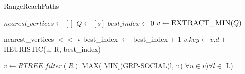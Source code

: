{%




\begin{algorithm}[t]
\caption{RangeReachPaths}
\begin{scriptsize}
\label{alg3}
\begin{algorithmic}[1]
	\State $nearest\_vertices \gets []$
	\State $Q \gets [s]$
	\State $best\_index \gets 0$
	  \label{alg:theqstart}
		\State $v \gets \Call{EXTRACT\_MIN}{Q}$
		
			\State nearest\_vertices $<<$ v 
			\State best\_index $\gets$ best\_index + 1
				\State \Return {}
			\EndIf
			 
				\State $v.key \gets v.d +$ HEURISTIC(u, R, best\_index)
			\EndFor
		\EndIf
		
			\State {}
		\EndIf
	\EndWhile	\label{alg:theqend}
\EndFunction

	\State $v \gets RTREE.filter(R)$   	
	\State \Return MAX( MIN$_i$(GRP-SOCIAL(l, u) $\forall u \in v) \forall l \in$ L)
\EndFunction


\end{algorithmic}
\end{scriptsize}
\end{algorithm}}
